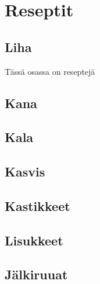 \documentclass[twosides, 11pt]{book}
\begin{document}
\tableofcontents


\part*{Reseptit}
\chapter*{Liha}
Tässä osassa on reseptejä


\chapter*{Kana}
\chapter*{Kala}

\chapter*{Kasvis}
\chapter*{Kastikkeet}

\chapter*{Lisukkeet}
\chapter*{Jälkiruuat}
\end{document}
